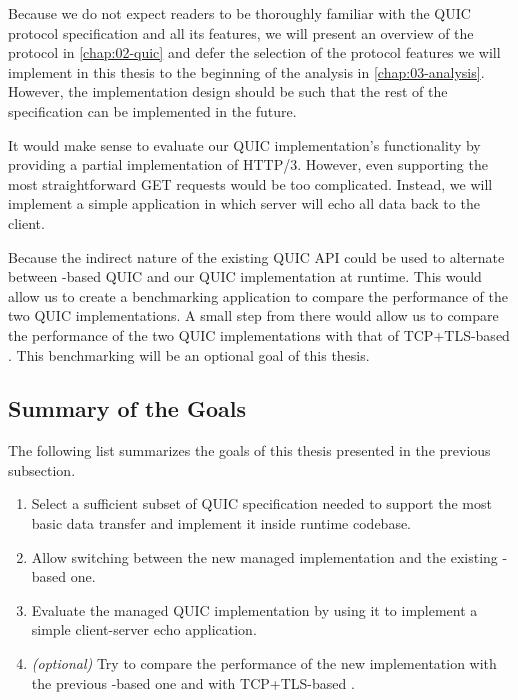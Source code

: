 Because we do not expect readers to be thoroughly familiar with the QUIC protocol specification and
all its features, we will present an overview of the protocol in \autoref{chap:02-quic} and defer
the selection of the protocol features we will implement in this thesis to the beginning of the
analysis in \autoref{chap:03-analysis}. However, the implementation design should be such that the
rest of the specification can be implemented in the future.


It would make sense to evaluate our QUIC implementation's functionality by providing a partial
implementation of HTTP/3. However, even supporting the most straightforward GET requests would be
too complicated. Instead, we will implement a simple application in which server will echo all data
back to the client.

Because the indirect nature of the existing QUIC API could be used to alternate between
\libmsquic{}-based QUIC and our QUIC implementation at runtime. This would allow us to create a
benchmarking application to compare the performance of the two QUIC implementations. A small step
from there would allow us to compare the performance of the two QUIC implementations with that of
TCP+TLS-based . This benchmarking will be an optional goal of this thesis.

\subsection*{Summary of the Goals}


The following list summarizes the goals of this thesis presented in the previous subsection.

\begin{enumerate}

  \item Select a sufficient subset of QUIC specification needed to support the most basic data
  transfer and implement it inside \dotnet{} runtime codebase.

  \item Allow switching between the new managed implementation and the existing \libmsquic{}-based one.

  \item Evaluate the managed QUIC implementation by using it to implement a simple client-server
echo application.

  \item \textit{(optional)} Try to compare the performance of the new implementation with the
previous \libmsquic{}-based one and with TCP+TLS-based .

\end{enumerate}

